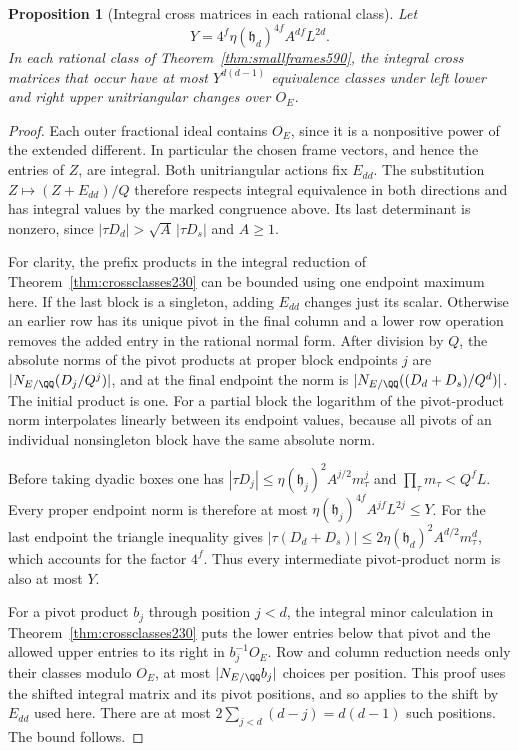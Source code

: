 \documentclass[a4paper,11pt]{article}
\newtheorem{proposition}{Proposition}[section]
\theoremstyle{definition}
\theoremstyle{remark}
\numberwithin{equation}{section}
\begin{document}
\begin{proposition}[Integral cross matrices in each rational class]
\leavevmode\label{prop:smallcross590}
Let
\[
       Y=4^f\eta(\mathfrak h_d)^{4f} A^{df}L^{2d}.
\]
In each rational class of Theorem~\ref{thm:smallframes590},
the integral cross matrices that occur have at most
\(Y^{d(d-1)}\) equivalence classes under left lower and
right upper unitriangular changes over \(O_E\).
\end{proposition}
\begin{proof}
Each outer fractional ideal contains \(O_E\), since it is a
nonpositive power of the extended different. In particular
the chosen frame vectors, and hence the entries of \(Z\),
are integral. Both unitriangular actions fix \(E_{dd}\).
The substitution \(Z\mapsto(Z+E_{dd})/Q\) therefore
respects integral equivalence in both directions and has
integral values by the marked congruence above. Its last
determinant is nonzero, since
\(|\tau D_d|>\sqrt A\,|\tau D_s|\) and \(A\ge1\).

For clarity, the prefix products in the integral reduction
of Theorem~\ref{thm:crossclasses230} can be bounded using
one endpoint maximum here. If the last block is a singleton,
adding \(E_{dd}\) changes just its scalar. Otherwise an
earlier row has its unique pivot in the final column and
a lower row operation removes the added entry in the rational
normal form. After division by \(Q\), the absolute norms
of the pivot products at proper block endpoints \(j\) are
\(|N_{E/\QQ}(D_j/Q^j)|\), and at the final endpoint the
norm is \(|N_{E/\QQ}((D_d+D_s)/Q^d)|\). The initial product
is one. For a partial block the logarithm of the pivot-product
norm interpolates linearly between its endpoint values,
because all pivots of an individual nonsingleton block have
the same absolute norm.

Before taking dyadic boxes one has
\(|\tau D_j|\le\eta(\mathfrak h_j)^2 A^{j/2}m_\tau^j\)
and \(\prod_\tau m_\tau<Q^f L\). Every proper endpoint
norm is therefore at most \(\eta(\mathfrak h_j)^{4f}
A^{jf}L^{2j}\le Y\). For the last endpoint the triangle
inequality gives
\(|\tau(D_d+D_s)|\le2\eta(\mathfrak h_d)^2 A^{d/2}m_\tau^d\),
which accounts for the factor \(4^f\). Thus every intermediate
pivot-product norm is also at most \(Y\).

For a pivot product \(b_j\) through position \(j<d\), the
integral minor calculation in Theorem~\ref{thm:crossclasses230}
puts the lower entries below that pivot and the allowed upper
entries to its right in \(b_j^{-1}O_E\). Row and column
reduction needs only their classes modulo \(O_E\), at most
\(|N_{E/\QQ}b_j|\) choices per position. This proof uses
the shifted integral matrix and its pivot positions, and
so applies to the shift by \(E_{dd}\) used here. There are
at most \(2\sum_{j<d}(d-j)=d(d-1)\) such positions. The
bound follows.
\end{proof}
\end{document}
